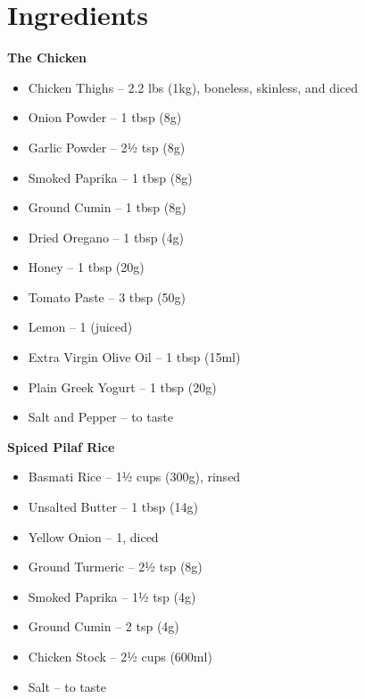 




\section*{Ingredients}

\textbf{The Chicken}
\begin{itemize}[itemsep=0.1em, label={\raisebox{-0.1ex}{\large\textbullet}}]
      \item[\cut] Chicken Thighs – 2.2 lbs (1kg), boneless, skinless, and diced
      \item[\measure] Onion Powder – 1 tbsp (8g)
      \item[\measure] Garlic Powder – 2½ tsp (8g)
      \item[\measure] Smoked Paprika – 1 tbsp (8g)
      \item[\measure] Ground Cumin – 1 tbsp (8g)
      \item[\measure] Dried Oregano – 1 tbsp (4g)
      \item[\measure] Honey – 1 tbsp (20g)
      \item[\measure] Tomato Paste – 3 tbsp (50g)
      \item[\measure] Lemon – 1 (juiced)
      \item[\measure] Extra Virgin Olive Oil – 1 tbsp (15ml)
      \item[\measure] Plain Greek Yogurt – 1 tbsp (20g)
      \item Salt and Pepper – to taste
\end{itemize}

\textbf{Spiced Pilaf Rice}
\begin{itemize}[itemsep=0.1em, label={\raisebox{-0.1ex}{\large\textbullet}}]
      \item Basmati Rice – 1½ cups (300g), rinsed
      \item Unsalted Butter – 1 tbsp (14g)
      \item[\cut] Yellow Onion – 1, diced
      \item[\measure] Ground Turmeric – 2½ tsp (8g)
      \item[\measure] Smoked Paprika – 1½ tsp (4g)
      \item[\measure] Ground Cumin – 2 tsp (4g)
      \item[\measure] Chicken Stock – 2½ cups (600ml)
      \item Salt – to taste
\end{itemize}

